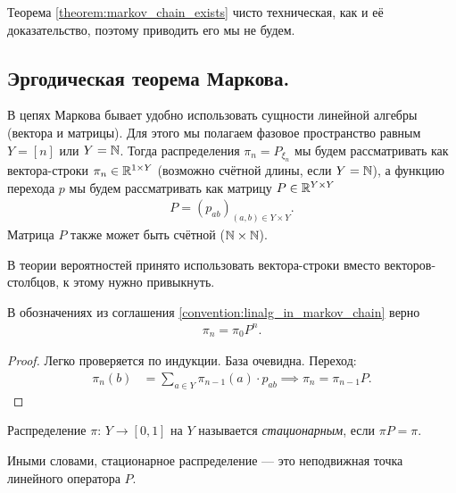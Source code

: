 \documentclass[../main.tex]{subfiles}
\begin{document}
Теорема \ref{theorem:markov_chain_exists} чисто техническая, как и её доказательство, поэтому приводить его мы не будем.

\subsection{Эргодическая теорема Маркова.}

\begin{conventn}
 \label{convention:linalg_in_markov_chain}
 В цепях Маркова бывает удобно использовать сущности линейной алгебры (вектора и матрицы). Для этого мы полагаем фазовое пространство равным $ Y = [n] $ или $ Y = \mathbb{N} $. Тогда распределения $ \pi_n = P_{\xi_n} $ мы будем рассматривать как вектора-строки $ \pi_n \in \mathbb{R}^{1 \times Y} $ (возможно счётной длины, если $ Y = \mathbb{N} $), а функцию перехода $ p $ мы будем рассматривать как матрицу $ P \in \mathbb{R}^{Y \times Y} $
 \begin{align*}
  P = \left( p_{ab} \right)_{(a,b)\in Y \times Y}.
 \end{align*} Матрица $ P $ также может быть счётной ($ \mathbb{N} \times \mathbb{N} $).

 В теории вероятностей принято использовать вектора-строки вместо векторов-столбцов, к этому нужно привыкнуть.
\end{conventn}

\begin{thm}
 В обозначениях из соглашения \ref{convention:linalg_in_markov_chain} верно
 \begin{align*}
  \pi_n = \pi_0 P^{n}.
 \end{align*}
\end{thm}
\begin{proof}
 Легко проверяется по индукции. База очевидна. Переход:
 \begin{align*}
  \pi_n(b) &= \sum_{a \in Y} \pi_{n-1}(a) \cdot p_{ab} \implies \pi_n = \pi_{n-1} P.
 \end{align*}
\end{proof}

\begin{df}
 Распределение $ \pi \colon\, Y \to [0,1] $ на $ Y $ называется \textit{стационарным}, если $ \pi P = \pi $.

 Иными словами, стационарное распределение --- это неподвижная точка линейного оператора $ P $.
\end{df}
\end{document}
